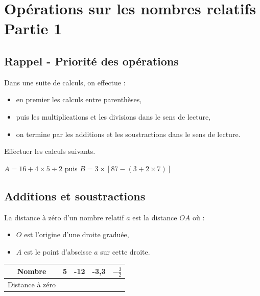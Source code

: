 \documentclass[a4paper]{book}
\begin{document}
\setcounter{chapter}{2}
\renewcommand{\monTitre}{Opérations sur les nombres relatifs \\ Partie 1}
\chapter{\monTitre}
\thispagestyle{fancy} 


\section{Rappel - Priorité des opérations}
    \begin{convention}
        Dans une suite de calculs, on effectue :
        \begin{itemize}
            \item en premier les calculs entre parenthèses,
            \item puis les multiplications et les divisions dans le sens de lecture,
            \item on termine par les additions et les soustractions dans le sens de lecture.
        \end{itemize}
    \end{convention}
    
    
    \begin{exemple}
        Effectuer les calculs suivants.
        
        \(A = 16 + 4 \times 5\div2 \) puis 
        \( B = 3\times[87-(3+2\times7)]\)
    \end{exemple}

    
\section{Additions et soustractions}

    \begin{definition}
        La distance à zéro d'un nombre relatif \( a \) est la distance \( OA \) où :
        \begin{itemize}
            \item \( O \) est l'origine d'une droite graduée,
            \item \( A \) est le point d'abscisse \( a \) sur cette droite.
        \end{itemize}
    \end{definition}
    
    \begin{exemple} 
            \centering
            \begin{tabular}{|c|c|c|c|c|}
                \hline
                Nombre & 5 & -12 & -3,3 & $-\frac{3}{2}$ \\ \hline
                Distance à zéro & & & & \\ \hline
            \end{tabular}
    \end{exemple}
\end{document}
